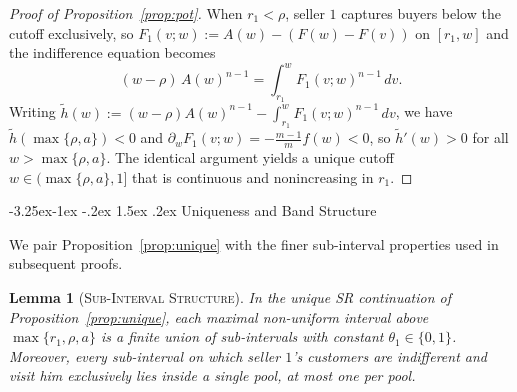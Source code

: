 \documentclass[12pt]{article}
\makeatletter
\theoremstyle{mystyle}
\newtheorem{lemma}{Lemma}
\theoremstyle{mystyle2}
\newcommand{\mmpfont}{\scshape}
\renewcommand\subsection{\@startsection{subsection}{2}{\z@}%
                                     {-3.25ex\@plus -1ex \@minus -.2ex}%
                                     {1.5ex \@plus .2ex}%
                                     {\normalfont\normalsize\mmpfont}}
\newcommand{\1}{\mathbf{1}}
\makeatother
\begin{document}
\begin{proof}[Proof of Proposition~\ref{prop:pot}]
When $r_1<\rho$, seller $1$ captures buyers below the cutoff exclusively, so $F_1(v;w):=A(w)-(F(w)-F(v))$ on $[r_1,w]$ and the indifference equation becomes
\begin{equation}\label{eq:w_rev}
(w - \rho)\,A(w)^{n-1} = \int_{r_1}^w F_1(v;w)^{n-1}\,dv.
\end{equation}
Writing $\tilde h(w):=(w-\rho)A(w)^{n-1}-\int_{r_1}^w F_1(v;w)^{n-1}\,dv$, we have $\tilde h(\max\{\rho,a\})<0$ and $\partial_w F_1(v;w)=-\frac{m-1}{m}f(w)<0$, so $\tilde h'(w)>0$ for all $w>\max\{\rho,a\}$. The identical argument yields a unique cutoff $w\in(\max\{\rho,a\},1]$ that is continuous and nonincreasing in $r_1$.
\end{proof}

\subsection{Uniqueness and Band Structure}

We pair Proposition~\ref{prop:unique} with the finer sub-interval properties used in subsequent proofs.

\begin{lemma}[\textsc{Sub-Interval Structure}]\label{lem:loc_detail}
In the unique SR continuation of Proposition~\ref{prop:unique}, each maximal non-uniform interval above $\max\{r_1,\rho,a\}$ is a finite union of sub-intervals with constant $\theta_1\in\{0,1\}$. Moreover, every sub-interval on which seller $1$'s customers are indifferent and visit him exclusively lies inside a single pool, at most one per pool.
\end{lemma}
\end{document}
